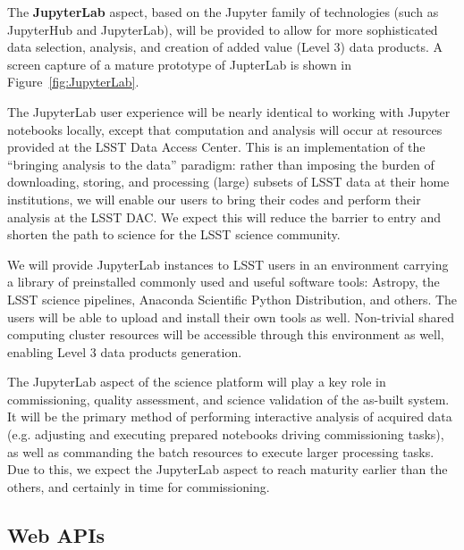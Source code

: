 The \textbf{JupyterLab} aspect, based on the Jupyter family of technologies (such as
JupyterHub and JupyterLab), will be provided to allow for more sophisticated
data selection, analysis, and creation of added value (Level 3) data
products. A screen capture of a mature prototype of JupterLab is shown in
Figure~\ref{fig:JupyterLab}.

The JupyterLab user experience will be nearly identical to working with
Jupyter notebooks locally, except that computation and analysis will occur
at resources provided at the LSST Data Access Center.  This is an
implementation of the “bringing analysis to the data” paradigm: rather
than imposing the burden of downloading, storing, and processing (large)
subsets of LSST data at their home institutions, we will enable our users to
bring their codes and perform their analysis at the LSST DAC.  We expect
this will reduce the barrier to entry and shorten the path to science for
the LSST science community.

We will provide JupyterLab instances to LSST users in an environment carrying a
library of preinstalled commonly used and useful software tools:
Astropy, the LSST science pipelines, Anaconda Scientific Python Distribution,
and others. The users will be able to upload and install their own tools as well.
Non-trivial shared computing cluster resources will be accessible through this
environment as well, enabling Level 3 data products generation.


The JupyterLab aspect of the science platform will play a key role in commissioning,
quality assessment, and science validation of the as-built system. It will be the primary
method of performing interactive analysis of acquired data (e.g. adjusting and executing
prepared notebooks driving commissioning tasks), as well as commanding
the batch resources to execute larger processing tasks. Due to this, we expect the
JupyterLab aspect to reach maturity earlier than the others, and certainly in time for
commissioning.


\subsection{Web APIs\label{sec:apis}}

